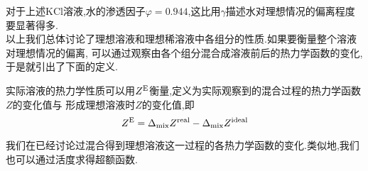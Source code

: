 \documentclass{ctexart}
\begin{document}
对于上述$\text{KCl}$溶液,水的渗透因子$\varphi=0.944$,这比用$\gamma$描述水对理想情况的偏离程度要显著得多.\vspace{4pt}\\
\indent 以上我们总体讨论了理想溶液和理想稀溶液中各组分的性质.如果要衡量整个溶液对理想情况的偏离,%
可以通过观察由各个组分混合成溶液前后的热力学函数的变化,于是就引出了下面的定义.
\begin{definition}[4C.5.4 超额函数]
    实际溶液的热力学性质可以用$Z^\text E$衡量,定义为实际观察到的混合过程的热力学函数$Z$的变化值与%
    形成理想溶液时$Z$的变化值,即
    \[Z^\text E=\Delta_{\text{mix}}Z^{\text{real}}-\Delta_{\text{mix}}Z^{\text{ideal}}\]

\end{definition}
我们在已经讨论过混合得到理想溶液这一过程的各热力学函数的变化.类似地,我们也可以通过活度求得超额函数.
\end{document}
